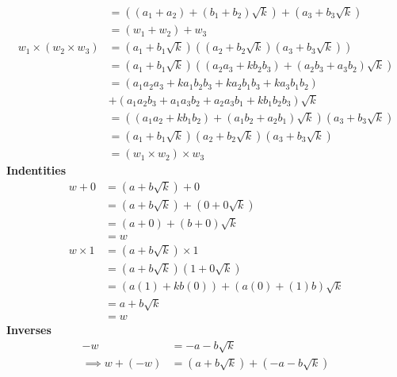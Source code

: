 \documentclass[addpoints]{exam}
\theoremstyle{mytheoremstyle}
\theoremstyle{mytheoremstyle}
\theoremstyle{myproblemstyle}
\begin{document}
\begin{questions}
\begin{parts}
\begin{solution}
\begin{align*}
				                                & = ((a_{1}+a_{2})+(b_{1}+b_{2})\sqrt{k})+(a_{3}+b_{3}\sqrt{k})                     \\
				                                & = (w_{1}+w_{2})+w_{3}                                                             \\
				w_{1}\times (w_{2}\times w_{3}) & = (a_{1}+b_{1}\sqrt{k})((a_{2}+b_{2}\sqrt{k})(a_{3}+b_{3}\sqrt{k}))               \\
				                                & = (a_{1}+b_{1}\sqrt{k})((a_{2}a_{3}+kb_{2}b_{3})+(a_{2}b_{3}+a_{3}b_{2})\sqrt{k}) \\
				                                & = (a_{1}a_{2}a_{3}+ka_{1}b_{2}b_{3}+ka_{2}b_{1}b_{3}+ka_{3}b_{1}b_{2})            \\
				                                & +(a_{1}a_{2}b_{3}+a_{1}a_{3}b_{2}+a_{2}a_{3}b_{1}+kb_{1}b_{2}b_{3})\sqrt{k}       \\
				                                & = ((a_{1}a_{2}+kb_{1}b_{2})+(a_{1}b_{2}+a_{2}b_{1})\sqrt{k})(a_{3}+b_{3}\sqrt{k}) \\
				                                & = (a_{1}+b_{1}\sqrt{k})(a_{2}+b_{2}\sqrt{k})(a_{3}+b_{3}\sqrt{k})                 \\
				                                & = (w_{1}\times w_{2})\times w_{3}
			\end{align*}
			\textbf{Indentities}
			\begin{align*}
				w+0       & = (a+b\sqrt{k})+0                  \\
				          & = (a+b\sqrt{k})+(0+0\sqrt{k})      \\
				          & = (a+0)+(b+0)\sqrt{k}              \\
				          & = w                                \\
				w\times 1 & = (a+b\sqrt{k})\times 1            \\
				          & = (a+b\sqrt{k})(1+0\sqrt{k})       \\
				          & = (a(1)+kb(0))+(a(0)+(1)b)\sqrt{k} \\
				          & = a+b\sqrt{k}                      \\
				          & = w
			\end{align*}
			\textbf{Inverses}
			\begin{align*}
				-w                      & = -a-b\sqrt{k}                                        \\
				\implies w+(-w)         & = (a+b\sqrt{k})+(-a-b\sqrt{k})                        \\

\end{align*}
\end{solution}
\end{parts}
\end{questions}
\end{document}
